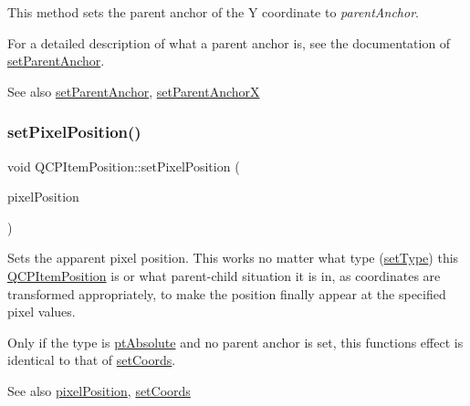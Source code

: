 This method sets the parent anchor of the Y coordinate to {\itshape parent\+Anchor}.

For a detailed description of what a parent anchor is, see the documentation of \hyperlink{classQCPItemPosition_ac094d67a95d2dceafa0d50b9db3a7e51}{set\+Parent\+Anchor}.

\begin{DoxySeeAlso}{See also}
\hyperlink{classQCPItemPosition_ac094d67a95d2dceafa0d50b9db3a7e51}{set\+Parent\+Anchor}, \hyperlink{classQCPItemPosition_add71461a973927c74e42179480916d9c}{set\+Parent\+AnchorX} 
\end{DoxySeeAlso}
\mbox{\label{classQCPItemPosition_a8d4f858f2089973967cf9cb81970ef0a}} 
\subsubsection{\texorpdfstring{set\+Pixel\+Position()}{setPixelPosition()}}
{\footnotesize\ttfamily void Q\+C\+P\+Item\+Position\+::set\+Pixel\+Position (\begin{DoxyParamCaption}\item[{const Q\+PointF \&}]{pixel\+Position }\end{DoxyParamCaption})}

Sets the apparent pixel position. This works no matter what type (\hyperlink{classQCPItemPosition_aa476abf71ed8fa4c537457ebb1a754ad}{set\+Type}) this \hyperlink{classQCPItemPosition}{Q\+C\+P\+Item\+Position} is or what parent-\/child situation it is in, as coordinates are transformed appropriately, to make the position finally appear at the specified pixel values.

Only if the type is \hyperlink{classQCPItemPosition_aad9936c22bf43e3d358552f6e86dbdc8a564f5e53e550ead1ec5fc7fc7d0b73e0}{pt\+Absolute} and no parent anchor is set, this function\textquotesingle{}s effect is identical to that of \hyperlink{classQCPItemPosition_aa988ba4e87ab684c9021017dcaba945f}{set\+Coords}.

\begin{DoxySeeAlso}{See also}
\hyperlink{classQCPItemPosition_a8be9a4787635433edecc75164beb748d}{pixel\+Position}, \hyperlink{classQCPItemPosition_aa988ba4e87ab684c9021017dcaba945f}{set\+Coords} 
\end{DoxySeeAlso}
\mbox{\label{classQCPItemPosition_aa476abf71ed8fa4c537457ebb1a754ad}} 
